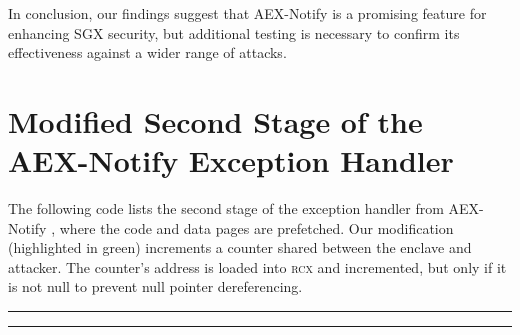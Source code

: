 \documentclass{llncs}
\begin{document}
In conclusion, our findings suggest that AEX-Notify is a promising feature for
enhancing SGX security, but additional testing is necessary to confirm its
effectiveness against a wider range of attacks.


%


\clearpage
\appendix

\section{Modified Second Stage of the AEX-Notify Exception Handler}

The following code lists the second stage of the exception handler from AEX-Notify \cite{ConstableBCXXAK23},
where the code and data pages are prefetched.
Our modification (highlighted in green) increments a counter shared between the enclave and attacker.
The counter's address is loaded into \textsc{rcx} and incremented, but only if it is not null to prevent null pointer dereferencing.

\noindent
\rule{0.8\textwidth}{0.4pt}
\vspace{-0.5em}
%
\vspace{-1.1em}
%
\vspace{-1.1em}

\vspace{-1em}
\rule{0.8\textwidth}{0.4pt}
\end{document}
